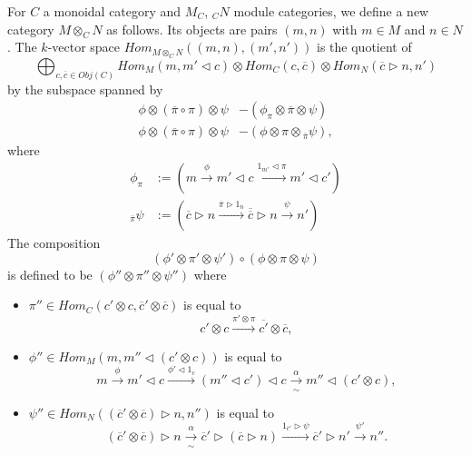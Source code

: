\begin{definition}

For $C$ a monoidal category and $M_C$, $_{C}N$ module categories, we define a new category $M\otimes_C N$ as follows. Its objects are pairs $(m,n)$ with $m\in M$ and $n\in N$. The $k$-vector space $Hom_{M\otimes_C N}((m,n),(m',n'))$ is the quotient of $$\bigoplus_{c,\overline{c} \in Obj(C)} Hom_{M}(m, m' \lhd c) \otimes Hom_{C}(c,\overline{c}) \otimes Hom_{N} (\overline{c} \rhd n, n')$$ by the subspace spanned by \begin{align}
    \phi \otimes (\overline{\pi} \circ \pi) \otimes \psi &- (\phi_{\pi} \otimes \overline{\pi} \otimes \psi) \label{relation/a} \\
    \phi \otimes (\overline{\pi} \circ \pi) \otimes \psi &- (\phi \otimes \pi \otimes {}_{\overline{\pi}}\psi) \label{relation/b},
  \end{align}
  where
  \begin{align}
    \phi_{\pi}  &:= \left( m \xrightarrow{\phi} m' \lhd c \xrightarrow{1_{m'} \lhd \pi} m' \lhd c' \right)\\
    {}_{\overline{\pi}}\psi &:= \left( \overline{c} \rhd n \xrightarrow{\overline{\pi} \rhd 1_{n}} \overline{\overline{c}} \rhd n \xrightarrow{\psi} n' \right)
  \end{align}   The composition
  \[
    (\phi' \otimes \pi' \otimes \psi' ) \circ (\phi \otimes \pi \otimes \psi)
  \]
  is defined to be $(\phi'' \otimes \pi'' \otimes \psi'')$ where
  \begin{itemize}
    \item
    $\pi'' \in Hom_{C}(c' \otimes c, \overline{c}' \otimes \overline{c})$ is equal to
    \[
      c' \otimes c \xrightarrow{\pi' \otimes \pi} \overline{c'} \otimes \overline{c},
    \]
    \item
    \noindent $\phi'' \in Hom_{M}(m, m'' \lhd (c' \otimes c))$ is equal to
    \[
      m \xrightarrow{\phi} m' \lhd c \xrightarrow{\phi' \lhd 1_{c}} (m'' \lhd c') \lhd c \xrightarrow[\sim]{\alpha} m'' \lhd (c' \otimes c),
    \]
    \item
    \noindent $\psi'' \in Hom_{N}((\overline{c}' \otimes \overline{c}) \rhd n, n'')$ is equal to
    \[
      (\overline{c}' \otimes \overline{c}) \rhd n \xrightarrow[\sim]{\alpha} \overline{c}' \rhd (\overline{c} \rhd n) \xrightarrow{1_{\overline{c}'} \rhd \psi} \overline{c}' \rhd n' \xrightarrow{\psi'} n''.
    \]
  \end{itemize} \end{definition}

